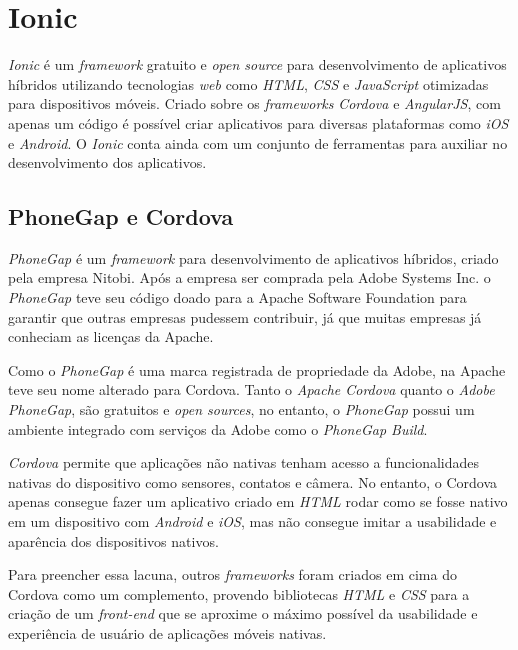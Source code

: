 \section{Ionic} \label{ionic}

\textit{Ionic} é um \textit{framework} gratuito e \textit{open source} para desenvolvimento de aplicativos híbridos utilizando tecnologias 
\textit{web} como \textit{HTML}, \textit{CSS} e \textit{JavaScript} otimizadas para dispositivos móveis. Criado sobre os \textit{frameworks} \textit{Cordova} e \textit{AngularJS},
com apenas um código é possível criar aplicativos para diversas plataformas como \textit{iOS} e \textit{Android}. O \textit{Ionic} conta ainda com um conjunto de ferramentas para auxiliar 
no desenvolvimento dos aplicativos.

\subsection{PhoneGap e Cordova} \label{subsec:phonegap}

\textit{PhoneGap} é um \textit{framework} para desenvolvimento de aplicativos híbridos, criado pela empresa Nitobi. 
Após a empresa ser comprada pela Adobe Systems Inc. o \textit{PhoneGap} teve seu código doado para a Apache Software Foundation 
para garantir que outras empresas pudessem contribuir, já que muitas empresas já conheciam as licenças da Apache.


Como o \textit{PhoneGap} é uma marca registrada de propriedade da Adobe, na Apache teve seu nome alterado para Cordova.
Tanto o \textit{Apache Cordova} quanto o \textit{Adobe PhoneGap}, são gratuitos e \textit{open sources}, no entanto, o 
\textit{PhoneGap} possui um ambiente integrado com serviços da Adobe como o \textit{PhoneGap Build}.
 
\textit{Cordova} permite que aplicações não nativas tenham acesso a funcionalidades nativas do dispositivo como sensores, 
contatos e câmera. No entanto, o Cordova apenas consegue fazer um aplicativo criado em 
\textit{HTML} rodar como se fosse nativo em um dispositivo com \textit{Android} e \textit{iOS}, mas não consegue 
imitar a usabilidade e aparência dos dispositivos nativos. 


Para preencher essa lacuna, outros \textit{frameworks} foram criados em cima do Cordova como um complemento, 
provendo bibliotecas \textit{HTML} e \textit{CSS} para a 
criação de um \textit{front-end} que se aproxime o máximo possível da usabilidade e experiência de usuário de 
aplicações móveis nativas.

